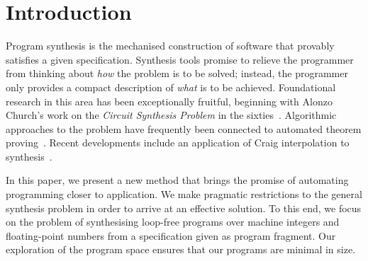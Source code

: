 \algrenewcommand{}
\algrenewcommand{}

\newcommand{\newC}{C$^-$\xspace}
\newcommand*\Let[2]{\State #1 $\gets$ #2}

\newcommand{\bv}[2]{\mathcal{BV}(#1, #2)}

\makeatletter
{}
\makeatother


\iffalse
\section{Introduction}

Program synthesis is the mechanised construction of software that provably
satisfies a given specification.  Synthesis tools promise to relieve the
programmer from thinking about \emph{how} the problem is to be solved;
instead, the programmer only provides a compact description of \emph{what}
is to be achieved.  Foundational research in this area has been
exceptionally fruitful, beginning with Alonzo Church's work on the
\emph{Circuit Synthesis Problem} in the sixties~\cite{church-synth}.
Algorithmic approaches to the problem have frequently been connected to
automated theorem proving~\cite{manna-waldinger,proof-planning}.
Recent developments include an application of Craig interpolation
to synthesis~\cite{synth-interpolants}.

In this paper, we present a new method that brings the promise of
automating programming closer to application.  We make pragmatic
restrictions to the general synthesis problem in order to arrive at an
effective solution.  To this end, we focus on the problem of synthesising
loop-free programs over machine integers and floating-point numbers from a
specification given as program fragment.  Our exploration of the program
space ensures that our programs are minimal in size.

